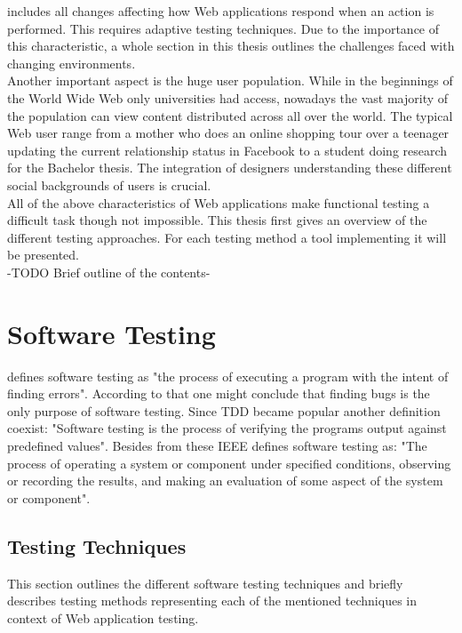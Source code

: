 \documentclass[12pt, notitlepage]{article}
\begin{document}
includes all changes affecting how Web applications respond when an action is performed. 
This requires adaptive testing techniques. Due to the importance of this characteristic, a whole section in this thesis outlines the challenges faced
with changing environments.\\ 
Another important aspect is the huge user population. While in the beginnings of the World Wide Web only universities had access,
nowadays the vast majority of the population can view content distributed across all over the world. The typical Web user range from a
mother who does an online shopping tour over a teenager updating the current relationship status in Facebook to a student doing research for
the Bachelor thesis. The integration of designers understanding these different social backgrounds of users is crucial.\\


All of the above characteristics of Web applications make functional testing a difficult task though not impossible.
This thesis first gives an overview of the different testing approaches. For each 
testing method a tool implementing it will be presented.\\
-TODO Brief outline of the contents-
\newpage


\section{Software Testing}
\cite{art-of-software-testing} defines software testing as "the process of executing a program with the intent of finding errors".
According to that one might conclude that finding bugs is the only purpose of software testing. Since TDD\cite{tdd} became popular
another definition coexist: "Software testing is the process of verifying the programs output against predefined values". Besides from 
these IEEE\cite{ieee-definition} defines software testing as: "The process of operating a system or component under specified conditions, observing or recording the results, and making an evaluation of some aspect of the system or component".\\
\subsection{Testing Techniques}
This section outlines the different software testing techniques\cite{testing-methods} and briefly describes testing methods representing each of
the mentioned techniques in context of Web application testing.
\end{document}
